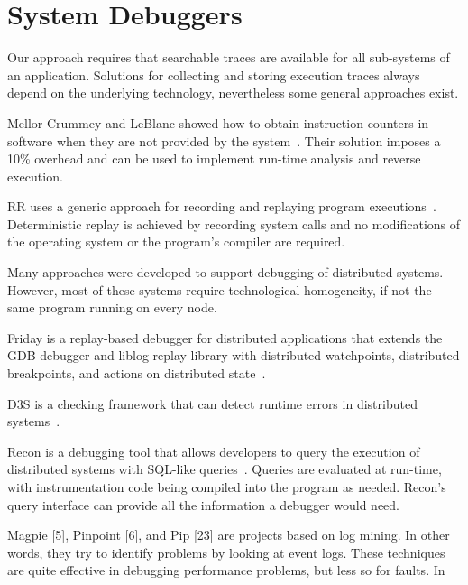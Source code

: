 \section{System Debuggers}
\label{sec:rw_system_debugging}

Our approach requires that searchable traces are available for all sub-systems of an application.
Solutions for collecting and storing execution traces always depend on the underlying technology, nevertheless some general approaches exist.

Mellor-Crummey and LeBlanc showed how to obtain instruction counters in software when they are not provided by the system~\cite{mellor-crummey89:a_software_instruction_counter}.
Their solution imposes a 10\% overhead and can be used to implement run-time analysis and reverse execution.

RR uses a generic approach for recording and replaying program executions~\cite{ocallahan_engineering_2017}.
Deterministic replay is achieved by recording system calls and no modifications of the operating system or the program's compiler are required.

Many approaches were developed to support debugging of distributed systems.
However, most of these systems require technological homogeneity, if not the same program running on every node.

Friday is a replay-based debugger for distributed applications that extends the GDB debugger and liblog replay library with distributed watchpoints, distributed breakpoints, and actions on distributed state~\cite{geels07:friday_global_comprehension}.


D3S is a checking framework that can detect runtime errors in distributed systems~\cite{liu08:d3s_debugging_deployed_distributed}.

Recon is a debugging tool that allows developers to query the execution of distributed systems with SQL-like queries~\cite{lee11:unified_debugging_of_distributed}.
Queries are evaluated at run-time, with instrumentation code being compiled into the program as needed. 
Recon's query interface can provide all the information a debugger would need.


Magpie [5], Pinpoint [6], and Pip [23] are projects based
on log mining. In other words, they try to identify problems
by looking at event logs. These techniques are quite effective
in debugging performance problems, but less so for faults. In


